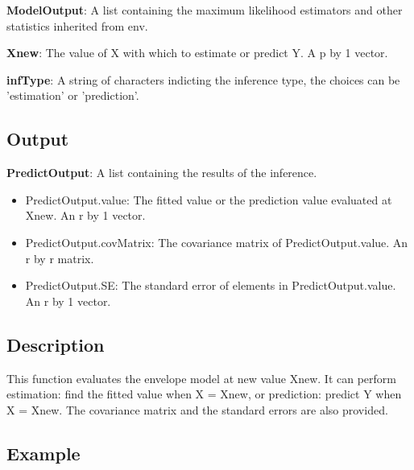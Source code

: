 \documentclass[a4paper,11pt,openany]{memoir}
\begin{document}
\begin{par}
\textbf{ModelOutput}: A list containing the maximum likelihood estimators and other statistics inherited from env.
\end{par} \vspace{1em}
\begin{par}
\textbf{Xnew}: The value of X with which to estimate or predict Y.  A p by 1 vector.
\end{par} \vspace{1em}
\begin{par}
\textbf{infType}: A string of characters indicting the inference type, the choices can be 'estimation' or 'prediction'.
\end{par} \vspace{1em}


\subsection*{Output}

\begin{par}
\textbf{PredictOutput}: A list containing the results of the inference.
\end{par} \vspace{1em}
\begin{itemize}
\setlength{\itemsep}{-1ex}
   \item PredictOutput.value: The fitted value or the prediction value evaluated at Xnew. An r by 1 vector.
   \item PredictOutput.covMatrix: The covariance matrix of PredictOutput.value. An r by r matrix.
   \item PredictOutput.SE: The standard error of elements in PredictOutput.value.  An r by 1 vector.
\end{itemize}


\subsection*{Description}

\begin{par}
This function evaluates the envelope model at new value Xnew.  It can perform estimation: find the fitted value when X = Xnew, or prediction: predict Y when X = Xnew.  The covariance matrix and the standard errors are also provided.
\end{par} \vspace{1em}


\subsection*{Example}
\end{document}

